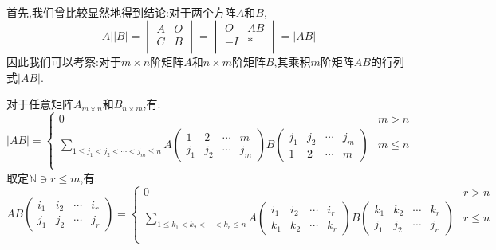 \documentclass[UTF8,a4paper,notitlepage]{book}
\begin{document}
        \paragraph{} 首先,我们曾比较显然地得到结论:对于两个方阵$A$和$B$,$$|A||B|=\begin{vmatrix} A&O\\ C&B\\ \end{vmatrix}=\begin{vmatrix} O&AB\\ -I&*\\ \end{vmatrix}=|AB|$$
        因此我们可以考察:对于$m\times n$阶矩阵$A$和$n\times m$阶矩阵$B$,其乘积$m$阶矩阵$AB$的行列式$|AB|$.
        \begin{theorem}
            对于任意矩阵$A_{m\times n}$和$B_{n\times m}$,有:
            $$|AB|=\left\{\begin{array}{ll} 0&m>n\\ \sum\limits_{1\leq j_1<j_2<\cdots<j_m\leq n} 
                A\begin{pmatrix}1 & 2 & \cdots & m \\ j_1 & j_2 & \cdots & j_m\end{pmatrix} 
                B\begin{pmatrix}j_1 & j_2 & \cdots & j_m \\ 1 & 2 & \cdots & m\end{pmatrix}
                &m\leq n\\ \end{array}\right.$$
            取定$\mathbb{N}\ni r\leq m$,有:
            $$AB\begin{pmatrix}i_1 & i_2 & \cdots & i_r \\ j_1 & j_2 & \cdots & j_r\end{pmatrix}=
                \left\{\begin{array}{ll} 0&r>n\\ \sum\limits_{1\leq k_1<k_2<\cdots<k_r\leq n} 
                A\begin{pmatrix} i_1 & i_2 & \cdots & i_r \\ k_1 & k_2 & \cdots & k_r\end{pmatrix} 
                B\begin{pmatrix} k_1 & k_2 & \cdots & k_r \\ j_1 & j_2 & \cdots & j_r\end{pmatrix}
                &r\leq n\\ \end{array}\right.$$
            \end{theorem}
\end{document}
